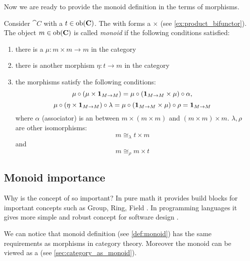 Now we are ready to provide the monoid definition in the terms of morphisms.
\begin{definition}[Monoid]
\label{def:monoid_category}
Consider  $\cat{C}$ with a
 $t \in \mathrm{ob}(\mathbf{C})$. The 
with  forms a
 $\times$ (see \cref{ex:product_bifunctor}).
The object $m \in
\mathrm{ob}(\mathbf{C})$ is called \textit{monoid} if the following
conditions satisfied:
\begin{enumerate}
\item there is a  $\mu: m \times m \to m$ in
  the category
\item there is another morphism $\eta: t \to m$ in the category
\item the morphisms satisfy the following conditions:
\begin{equation}
\mu\circ\left(\mu \times
    \mathbf{1}_{ M \to M }\right) = \mu \circ \left(\mathbf{1}_{ M \to M } \times \mu\right) \circ
    \alpha,
\label{eq:monoid_def_mu}
\end{equation}
\begin{equation}
\mu \circ (\eta \times \mathbf{1}_{ M \to M })
\circ \lambda = \mu \circ (\mathbf{1}_{ M \to M } \times \mu) \circ \rho =
\mathbf{1}_{ M \to M }
\label{eq:monoid_def_eta}
\end{equation}
where $\alpha$ (associator) is an  between
$m \times (m \times m)$ and $(m \times m) \times m$. $\lambda, \rho$
are other isomorphisms:  
\[
m \cong_\lambda t \times m
\]
and
\[
m \cong_\rho m \times t 
\]
\end{enumerate}
\end{definition}

\subsection{Monoid importance}
Why is the concept of  so important? 
In pure math it provides build blocks for important concepts such as
Group, Ring, Field \cite{github:galois_ivanmurashko}. In programming
languages it gives more simple and robust concept for software
design \cite{bib:scalable_program_arch}.

We can notice that monoid definition (see \cref{def:monoid}) has the
same requirements as morphisms in category theory. Moreover the monoid
can be viewed as a  (see
\cref{sec:category_as_monoid}).  

